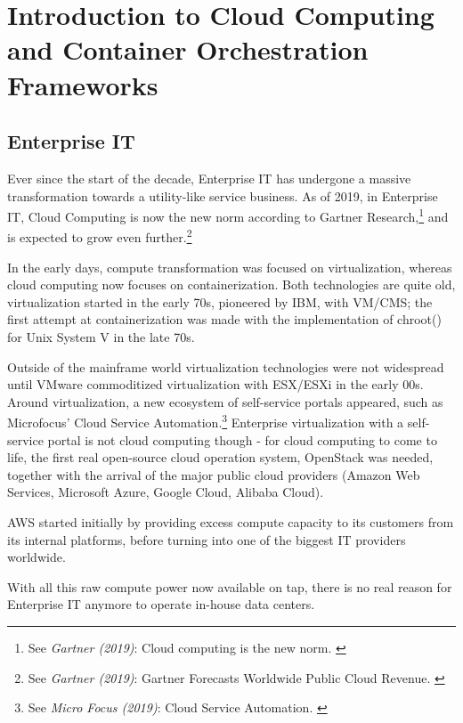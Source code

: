 %
%

\pagebreak
\section{Introduction to Cloud Computing and Container Orchestration Frameworks}

\onehalfspacing

\subsection{Enterprise IT}

Ever since the start of the decade, Enterprise IT has undergone a massive transformation towards a utility-like service business. As of 2019, in Enterprise IT, Cloud Computing is now the new norm according to Gartner Research,\footnote{See \textit{Gartner (2019)}: Cloud computing is the new norm. \cite{gartnerCloudStatement}} and is expected to grow even further.\footnote{See \textit{Gartner (2019)}: Gartner Forecasts Worldwide Public Cloud Revenue. \cite{gartnerForecast}}

In the early days, compute transformation was focused on virtualization, whereas cloud computing now focuses on containerization. Both technologies are quite old, virtualization started in the early 70s, pioneered by IBM, with VM/CMS; the first attempt at containerization was made with the implementation of chroot() for Unix System V in the late 70s.

Outside of the mainframe world virtualization technologies were not widespread until VMware commoditized virtualization with ESX/ESXi in the early 00s. Around virtualization, a new ecosystem of self-service portals appeared, such as Microfocus' Cloud Service Automation.\footnote{See \textit{Micro Focus (2019)}: Cloud Service Automation. \cite{csaMF}} Enterprise virtualization with a self-service portal is not cloud computing though - for cloud computing to come to life, the first real open-source cloud operation system, OpenStack was needed, together with the arrival of the major public cloud providers (Amazon Web Services, Microsoft Azure, Google Cloud, Alibaba Cloud).

AWS started initially by providing excess compute capacity to its customers from its internal platforms, before turning into one of the biggest IT providers worldwide.

With all this raw compute power now available on tap, there is no real reason for Enterprise IT anymore to operate in-house data centers.


